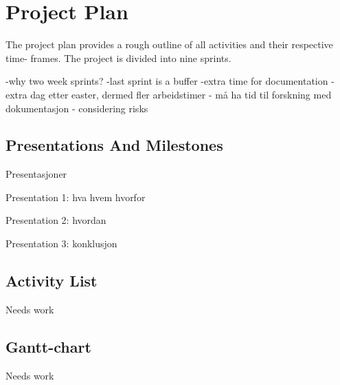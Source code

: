 \section{Project Plan}

The project plan provides a rough outline of all activities and their respective time- frames. The project is divided into nine sprints.

-why two week sprints?
-last sprint is a buffer
-extra time for documentation
-extra dag etter easter, dermed fler arbeidstimer 
- må ha tid til forskning med dokumentasjon
- considering risks


\subsection{Presentations And Milestones}



Presentasjoner

Presentation 1:
hva hvem hvorfor

Presentation 2:
hvordan

Presentation 3:
konklusjon

\subsection{Activity List}

Needs work

\subsection{Gantt-chart}

Needs work

\begin{comment}
Things that should be in a project plan/ description:

Scope management
Schedule management
Financial management
Quality management
Resource management
Stakeholder management – New from PMBOK 5[citation needed]
Communications management
Project change management
Risk management
\end{comment}